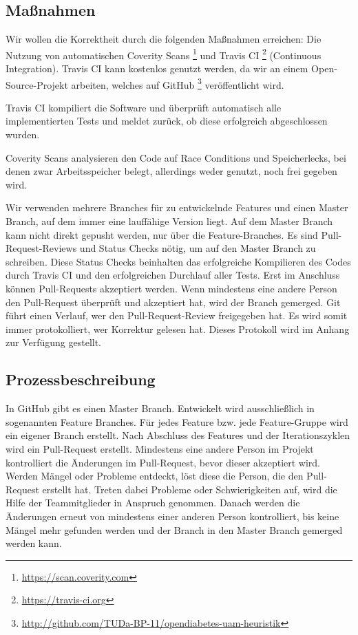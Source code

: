 \documentclass[accentcolor=tud0b,12pt,paper=a4]{tudreport}
\begin{document}
	\subsection{Maßnahmen}
Wir wollen die Korrektheit durch die folgenden Maßnahmen erreichen: Die Nutzung von automatischen Coverity Scans \footnote{\url{https://scan.coverity.com}} und Travis CI \footnote{\url{https://travis-ci.org}} (Continuous Integration). Travis CI kann kostenlos genutzt werden, da wir an einem Open-Source-Projekt arbeiten, welches auf GitHub \footnote{\url{http://github.com/TUDa-BP-11/opendiabetes-uam-heuristik}} veröffentlicht wird.

Travis CI kompiliert die Software und überprüft automatisch alle implementierten Tests und meldet zurück, ob diese erfolgreich abgeschlossen wurden. 

Coverity Scans analysieren den Code auf Race Conditions und Speicherlecks, bei denen zwar Arbeitsspeicher belegt, allerdings weder genutzt, noch frei gegeben wird. 

Wir verwenden mehrere Branches für zu entwickelnde Features und einen Master Branch, auf dem immer eine lauffähige Version liegt. Auf dem Master Branch kann nicht direkt gepusht werden, nur über die Feature-Branches. Es sind Pull-Request-Reviews und Status Checks nötig, um auf den Master Branch zu schreiben. Diese Status Checks beinhalten das erfolgreiche Kompilieren des Codes durch Travis CI und den erfolgreichen Durchlauf aller Tests. Erst im Anschluss können Pull-Requests akzeptiert werden. Wenn mindestens eine andere Person den Pull-Request überprüft und akzeptiert hat, wird der Branch gemerged. Git führt einen Verlauf, wer den Pull-Request-Review freigegeben hat. Es wird somit immer protokolliert, wer Korrektur gelesen hat. Dieses Protokoll wird im Anhang zur Verfügung gestellt.


	\subsection{Prozessbeschreibung}
In GitHub gibt es einen Master Branch. Entwickelt wird ausschließlich in sogenannten Feature Branches. Für jedes Feature bzw. jede Feature-Gruppe wird ein eigener Branch erstellt. Nach Abschluss des Features und der Iterationszyklen wird ein Pull-Request erstellt. Mindestens eine andere Person im Projekt kontrolliert die Änderungen im Pull-Request, bevor dieser akzeptiert wird. Werden Mängel oder Probleme entdeckt, löst diese die Person, die den Pull-Request erstellt hat. Treten dabei Probleme oder Schwierigkeiten auf, wird die Hilfe der Teammitglieder in Anspruch genommen. Danach werden die Änderungen erneut von mindestens einer anderen Person kontrolliert, bis keine Mängel mehr gefunden werden und der Branch in den Master Branch gemerged werden kann. 
\end{document}
